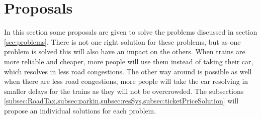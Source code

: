 \section{Proposals}
In this section some proposals are given to solve the problems discussed in section \ref{sec:problems}. There is not one right solution for these problems, but as one problem is solved this will also have an impact on the others. When trains are more reliable and cheaper, more people will use them instead of taking their car, which resolves in less road congestions. The other way around is possible as well when there are less road congestions, more people will take the car resolving in smaller delays for the trains as they will not be overcrowded. The subsections \cref{subsec:RoadTax,subsec:parkin,subsec:resSys,subsec:ticketPriceSolution} will propose an individual solutions for each problem.

